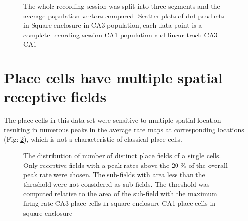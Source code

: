 \begin{figure}[htb!]
\centering
{}
\caption[Pooled CA3 population vectors]{The whole recording session was split into three segments and the average population vectors compared. Scatter plots of dot products in Square enclosure in  CA3 population, each data point is a complete recording session  CA1 population and linear track  CA3  CA1}
\label{fig:poolpvchunk}
\end{figure}


\section[Multiple Place fields]{Place cells have multiple spatial receptive fields}
\label{subfields}
The place cells in this data set were sensitive to multiple spatial location resulting in numerous peaks in the average rate maps at corresponding locations (Fig: \ref{fig:nsubfields}), which is not a characteristic of classical place cells. \\
\begin{figure}[htb!]
\centering
{}
\caption[Multiple receptive fields of Place Cells]{The distribution of number of distinct place fields of a single cells. Only receptive fields with a peak rates above the 20 \% of the overall peak rate were chosen. The sub-fields with area less than the threshold were not considered as sub-fields. The threshold was computed relative to the area of the sub-field with the maximum firing rate  CA3 place cells in square enclosure  CA1 place cells in square enclosure}
\label{fig:nsubfields}
\end{figure}

